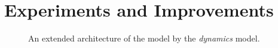 \chapter{Experiments and Improvements}

\begin{figure}[!ht]
\centering

\caption[An extended architecture of the model.]{An extended architecture of the model by the \emph{dynamics} model.}
\end{figure}
 
